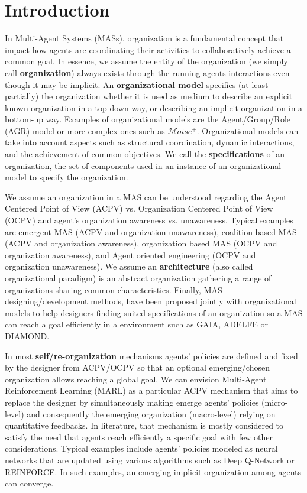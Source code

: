 \documentclass[runningheads]{llncs}
\begin{document}
\section{Introduction}

In Multi-Agent Systems (MASs), organization is a fundamental concept that impact how agents are coordinating their activities to collaboratively achieve a common goal\cite{Hubner2002}. In essence, we assume the entity of the organization (we simply call \textbf{organization}) always exists through the running agents interactions even though it may be implicit.
An \textbf{organizational model} specifies (at least partially) the organization whether it is used as medium to describe an explicit known organization in a top-down way, or describing an implicit organization in a bottom-up way. Examples of organizational models are the Agent/Group/Role (AGR) model\cite{Ferber2004} or more complex ones such as $\mathcal{M}oise^{+}$\cite{Hubner2002}. Organizational models can take into account aspects such as structural coordination, dynamic interactions, and the achievement of common objectives\cite{Ferber2004, Abbas2015}. We call the \textbf{specifications} of an organization, the set of components used in an instance of an organizational model to specify the organization.

We assume an organization in a MAS can be understood regarding the Agent Centered Point of View (ACPV) vs. Organization Centered Point of View (OCPV) and agent's organization awareness vs. unawareness\cite{Picard2009}.
Typical examples are emergent MAS (ACPV and organization unawareness), coalition based MAS (ACPV and organization awareness), organization based MAS (OCPV and organization awareness), and Agent oriented engineering (OCPV and organization unawareness)\cite{Picard2009}.
We assume an \textbf{architecture} (also called organizational paradigm) is an abstract organization gathering a range of organizations sharing common characteristics\cite{Horling2004}. Finally, MAS designing/development methods, have been proposed jointly with organizational models to help designers finding suited specifications of an organization so a MAS can reach a goal efficiently in a environment such as GAIA\cite{Wooldridge2000}, ADELFE\cite{Bernon2003} or DIAMOND\cite{Jamont2005}.

In most \textbf{self/re-organization} mechanisms agents' policies are defined and fixed by the designer from ACPV/OCPV so that an optional emerging/chosen organization allows reaching a global goal\cite{Picard2009}. We can envision Multi-Agent Reinforcement Learning (MARL) as a particular ACPV mechanism that aims to replace the designer by simultaneously making emerge agents' policies (micro-level) and consequently the emerging organization (macro-level) relying on quantitative feedbacks. In literature, that mechanism is mostly considered to satisfy the need that agents reach efficiently a specific goal with few other considerations. Typical examples include agents' policies modeled as neural networks that are updated using various algorithms such as Deep Q-Network or REINFORCE. In such examples, an emerging implicit organization among agents can converge.
\end{document}
